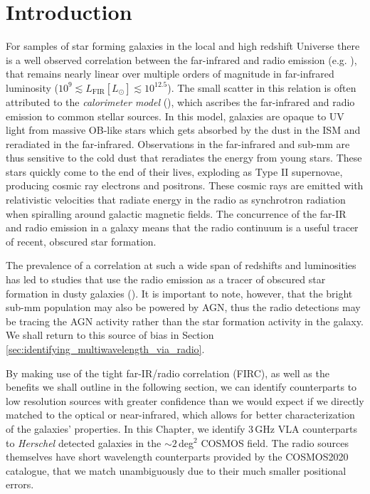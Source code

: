 \sloppy

\section{Introduction}

For samples of star forming galaxies in the local and high redshift Universe there is a well observed correlation between the far-infrared and radio emission (e.g. \citealt{Dickey_1984, deJong_1985, Helou_1985, Condon_1992, Barger_2000, Yun_2001, Garrett_2002, Appleton_2004, Ibar_2008, Seymour_2009, Sargent_2010}), that remains nearly linear over multiple orders of magnitude in far-infrared luminosity ($10^{9} \lesssim L_{\textrm{FIR}} [L_{\odot}] \lesssim 10^{12.5}$). The small scatter in this relation is often attributed to the \textit{calorimeter model} (\citealt{Voelk_1989, Lisenfeld_1996, Lacki_2010}), which ascribes the far-infrared and radio emission to common stellar sources. In this model, galaxies are opaque to UV light from massive OB-like stars which gets absorbed by the dust in the ISM and reradiated in the far-infrared. Observations in the far-infrared and sub-mm are thus sensitive to the cold dust that reradiates the energy from young stars. These stars quickly come to the end of their lives, exploding as Type II supernovae, producing cosmic ray electrons and positrons. These cosmic rays are emitted with relativistic velocities that radiate energy in the radio as synchrotron radiation when spiralling around galactic magnetic fields. The concurrence of the far-IR and radio emission in a galaxy means that the radio continuum is a useful tracer of recent, obscured star formation.

The prevalence of a correlation at such a wide span of redshifts and luminosities has led to studies that use the radio emission as a tracer of obscured star formation in dusty galaxies (\citealt{Kennicutt_2012}). It is important to note, however, that the bright sub-mm population may also be powered by AGN, thus the radio detections may be tracing the AGN activity rather than the star formation activity in the galaxy. We shall return to this source of bias in Section \ref{sec:identifying_multiwavelength_via_radio}.

By making use of the tight far-IR/radio correlation (FIRC), as well as the benefits we shall outline in the following section, we can identify counterparts to low resolution sources with greater confidence than we would expect if we directly matched to the optical or near-infrared, which allows for better characterization of the galaxies' properties. In this Chapter, we identify $3\,$GHz VLA counterparts to \textit{Herschel} detected galaxies in the $\sim2\,$deg$^2$ COSMOS field. The radio sources themselves have short wavelength counterparts provided by the COSMOS2020 catalogue, that we match unambiguously due to their much smaller positional errors.

